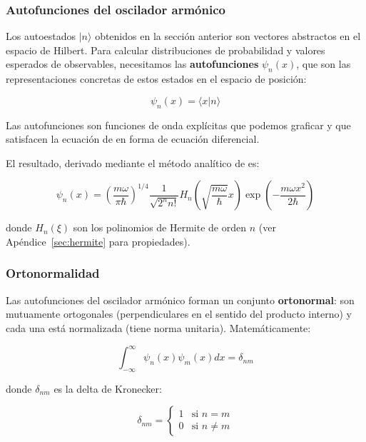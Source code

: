 \documentclass[11pt,a4paper,spanish]{book}
\begin{document}
\subsubsection{Autofunciones del oscilador armónico}

Los autoestados $|n\rangle$ obtenidos en la sección anterior son vectores abstractos en el espacio de Hilbert. Para calcular distribuciones de probabilidad y valores esperados de observables, necesitamos las \textbf{autofunciones} $\psi_n(x)$, que son las representaciones concretas de estos estados en el espacio de posición:

\begin{equation}
	\psi_n(x) = \langle x | n \rangle
\end{equation}

Las autofunciones son funciones de onda explícitas que podemos graficar y que satisfacen la ecuación de  \cite{schrodinger1926a} en forma de ecuación diferencial.

El resultado, derivado mediante el método analítico de \cite{schrodinger1926b} es:

\begin{equation}
	\psi_n(x) = \left(\frac{m\omega}{\pi\hbar}\right)^{1/4} \frac{1}{\sqrt{2^n n!}} H_n\left(\sqrt{\frac{m\omega}{\hbar}}x\right) \exp\left(-\frac{m\omega x^2}{2\hbar}\right)
	\label{eq:autofunciones}
\end{equation}

donde $H_n(\xi)$ son los polinomios de Hermite de orden $n$ (ver Apéndice~\ref{sec:hermite} para propiedades).


\subsubsection{Ortonormalidad}

Las autofunciones del oscilador armónico forman un conjunto \textbf{ortonormal}: son mutuamente ortogonales (perpendiculares en el sentido del producto interno) y cada una está normalizada (tiene norma unitaria). Matemáticamente:

\begin{equation}
	\int_{-\infty}^{\infty} \psi_n(x) \psi_m(x) dx = \delta_{nm}
\end{equation}

donde $\delta_{nm}$ es la delta de Kronecker:

\begin{equation}
	\delta_{nm} = \begin{cases} 
		1 & \text{si } n = m \\
		0 & \text{si } n \neq m
	\end{cases}
\end{equation}
\end{document}
